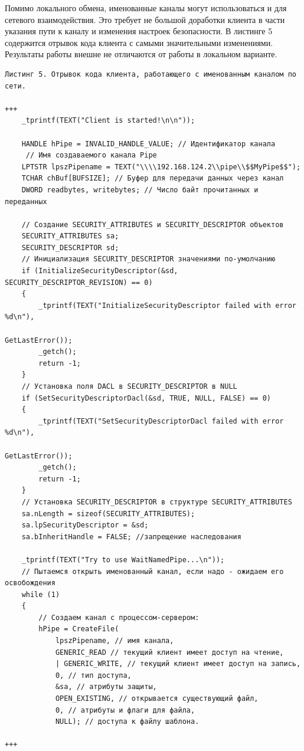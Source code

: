 \documentclass[a4paper,12pt]{article} %
\begin{document}
Помимо локального обмена, именованные каналы могут использоваться и для сетевого взаимодействия. Это требует не большой доработки клиента в части указания пути к каналу и изменения настроек безопасности. В листинге 5 содержится отрывок кода клиента с самыми значительными изменениями. Результаты работы внешне не отличаются от работы в локальном варианте.

\begin{verbatim}
Листинг 5. Отрывок кода клиента, работающего с именованным каналом по сети.

+++
    _tprintf(TEXT("Client is started!\n\n"));

    HANDLE hPipe = INVALID_HANDLE_VALUE; // Идентификатор канала
     // Имя создаваемого канала Pipe
    LPTSTR lpszPipename = TEXT("\\\\192.168.124.2\\pipe\\$$MyPipe$$");
    TCHAR chBuf[BUFSIZE]; // Буфер для передачи данных через канал
    DWORD readbytes, writebytes; // Число байт прочитанных и переданных

    // Создание SECURITY_ATTRIBUTES и SECURITY_DESCRIPTOR объектов
    SECURITY_ATTRIBUTES sa;
    SECURITY_DESCRIPTOR sd;
    // Инициализация SECURITY_DESCRIPTOR значениями по-умолчанию
    if (InitializeSecurityDescriptor(&sd, SECURITY_DESCRIPTOR_REVISION) == 0)
    {
        _tprintf(TEXT("InitializeSecurityDescriptor failed with error %d\n"),
                                                                GetLastError());
        _getch();
        return -1;
    }
    // Установка поля DACL в SECURITY_DESCRIPTOR в NULL
    if (SetSecurityDescriptorDacl(&sd, TRUE, NULL, FALSE) == 0)
    {
        _tprintf(TEXT("SetSecurityDescriptorDacl failed with error %d\n"),
                                                                GetLastError());
        _getch();
        return -1;
    }
    // Установка SECURITY_DESCRIPTOR в структуре SECURITY_ATTRIBUTES
    sa.nLength = sizeof(SECURITY_ATTRIBUTES);
    sa.lpSecurityDescriptor = &sd;
    sa.bInheritHandle = FALSE; //запрещение наследования

    _tprintf(TEXT("Try to use WaitNamedPipe...\n"));
    // Пытаемся открыть именованный канал, если надо - ожидаем его освобождения
    while (1)
    {
        // Создаем канал с процессом-сервером:
        hPipe = CreateFile(
            lpszPipename, // имя канала,
            GENERIC_READ // текущий клиент имеет доступ на чтение,
            | GENERIC_WRITE, // текущий клиент имеет доступ на запись,
            0, // тип доступа,
            &sa, // атрибуты защиты,
            OPEN_EXISTING, // открывается существующий файл,
            0, // атрибуты и флаги для файла,
            NULL); // доступа к файлу шаблона.

+++
\end{verbatim}
\end{document}
